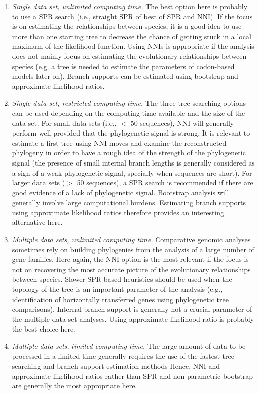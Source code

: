 \documentclass[a4paper,12pt]{article}
\begin{document}
\begin{enumerate}
\item {\em Single data set, unlimited computing time.} The best option here is probably to use a SPR
search (i.e., straight SPR of best of SPR and NNI).  If the focus is on estimating the relationships
between species,  it is a good  idea to use  more than one starting  tree to decrease the  chance of
getting stuck  in a  local maximum of  the likelihood  function.  Using NNIs  is appropriate  if the
analysis does not mainly focus on  estimating the evolutionary relationships between species (e.g. a
tree is needed to  estimate the parameters of codon-based models later  on).  Branch supports can be
estimated using bootstrap and approximate likelihood ratios.

\item {\em  Single data set, restricted  computing time.}  The  three tree searching options  can be
used depending on  the computing time available and the  size of the data set.   For small data sets
(i.e., $<$ 50 sequences),  NNI will generally perform well provided that  the phylogenetic signal is
strong.  It  is relevant  to estimate a  first tree  using NNI moves  and examine  the reconstructed
phylogeny in order to have a rough idea  of the strength of the phylogenetic signal (the presence of
small internal  branch lengths  is generally  considered as a  sign of  a weak  phylogenetic signal,
specially when  sequences are  short).  For larger  data sets  ($>$ 50 sequences),  a SPR  search is
recommended if there  are good evidence of  a lack of phylogenetic signal.   Bootstrap analysis will
generally  involve  large  computational  burdens.   Estimating branch  supports  using  approximate
likelihood ratios therefore provides an interesting alternative here.

\item {\em  Multiple data  sets, unlimited computing  time.} Comparative genomic  analyses sometimes
rely on building phylogenies from the analysis of  a large number of gene families.  Here again, the
NNI option is the most  relevant if the focus is not on recovering the  most accurate picture of the
evolutionary relationships  between species.   Slower SPR-based heuristics  should be used  when the
topology of the tree is an important parameter of the analysis (e.g., identification of horizontally
transferred genes using phylogenetic tree comparisons).   Internal branch support is generally not a
crucial parameter of the multiple data  set analyses. Using approximate likelihood ratio is probably
the best choice here.

\item {\em Multiple data sets, limited computing time.}  The large amount of data to be processed in
a  limited time  generally  requires  the use  of  the fastest  tree  searching  and branch  support
estimation methods Hence,  NNI and approximate likelihood ratios rather  than SPR and non-parametric
bootstrap are generally the most appropriate here.
\end{enumerate}
\end{document}
